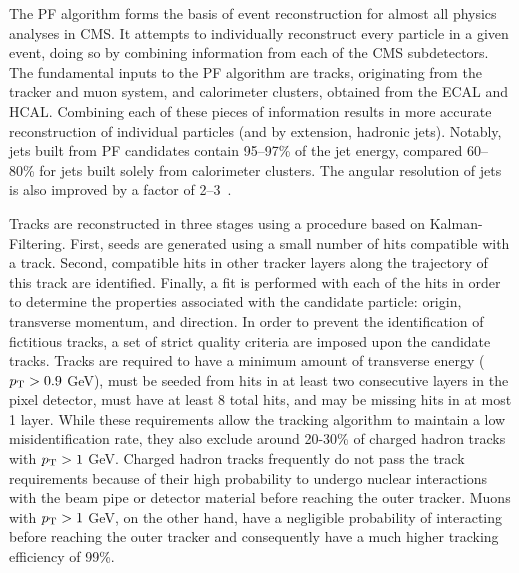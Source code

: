 The PF algorithm forms the basis of event reconstruction for almost all physics analyses in CMS.
It attempts to individually reconstruct every particle in a given event, doing so by combining information from each of the CMS subdetectors.
The fundamental inputs to the PF algorithm are tracks, originating from the tracker and muon system, and calorimeter clusters, obtained from the ECAL and HCAL.
Combining each of these pieces of information results in more accurate reconstruction of individual particles (and by extension, hadronic jets).
Notably, jets built from PF candidates contain 95--97\% of the jet energy, compared 60--80\% for jets built solely from calorimeter clusters.
The angular resolution of jets is also improved by a factor of 2--3~\cite{beaudette2014:Brient:2013hsa}.

Tracks are reconstructed in three stages using a procedure based on Kalman-Filtering.
First, seeds are generated using a small number of hits compatible with a track.
Second, compatible hits in other tracker layers along the trajectory of this track are identified.
Finally, a fit is performed with each of the hits in order to determine the properties associated with the candidate particle: origin, transverse momentum, and direction.
In order to prevent the identification of fictitious tracks, a set of strict quality criteria are imposed upon the candidate tracks.
Tracks are required to have a minimum amount of transverse energy ($p_{\mathrm{T}} > 0.9$ GeV), must be seeded from hits in at least two consecutive layers in the pixel detector, must have at least 8 total hits, and may be missing hits in at most 1 layer.
While these requirements allow the tracking algorithm to maintain a low misidentification rate, they also exclude around 20-30\% of charged hadron tracks with $p_{\mathrm{T}} > 1$ GeV.
Charged hadron tracks frequently do not pass the track requirements because of their high probability to undergo nuclear interactions with the beam pipe or detector material before reaching the outer tracker.
Muons with $p_{\mathrm{T}} > 1$ GeV, on the other hand, have a negligible probability of interacting before reaching the outer tracker and consequently have a much higher tracking efficiency of 99\%.


